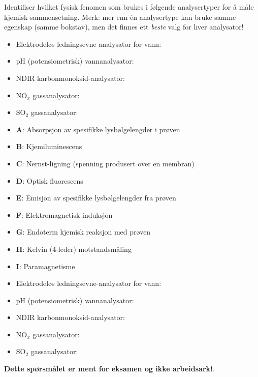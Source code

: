 

Identifiser hvilket fysisk fenomen som brukes i følgende analysertyper for å måle kjemisk sammensetning. Merk: mer enn én analysertype kan bruke samme egenskap (samme bokstav), men det finnes ett {\it beste} valg for hver analysator!

\begin{itemize}
\item{} Elektrodeløs ledningsevne-analysator for vann: \underbar{\hskip 50pt}
\item{} pH (potensiometrisk) vannanalysator: \underbar{\hskip 50pt}
\item{} NDIR karbonmonoksid-analysator: \underbar{\hskip 50pt}
\item{} NO$_{x}$ gassanalysator: \underbar{\hskip 50pt}
\item{} SO$_{2}$ gassanalysator: \underbar{\hskip 50pt}
\end{itemize}

\vskip 10pt

\begin{itemize}
\item {\bf A}: Absorpsjon av spesifikke lysbølgelengder i prøven
\item {\bf B}: Kjemiluminescens
\item {\bf C}: Nernst-ligning (spenning produsert over en membran)
\item {\bf D}: Optisk fluorescens
\item {\bf E}: Emisjon av spesifikke lysbølgelengder fra prøven
\item {\bf F}: Elektromagnetisk induksjon
\item {\bf G}: Endoterm kjemisk reaksjon med prøven
\item {\bf H}: Kelvin (4-leder) motstandsmåling 
\item {\bf I}: Paramagnetisme
\end{itemize}







\begin{itemize}
\item{} Elektrodeløs ledningsevne-analysator for vann: 
\item{} pH (potensiometrisk) vannanalysator: 
\item{} NDIR karbonmonoksid-analysator: 
\item{} NO$_{x}$ gassanalysator: 
\item{} SO$_{2}$ gassanalysator: 
\end{itemize}







{\bf Dette spørsmålet er ment for eksamen og ikke arbeidsark!}.



